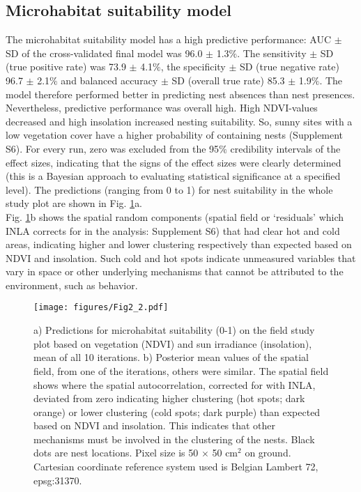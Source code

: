 \documentclass[10pt, twoside]{book} %
\begin{document}
	\subsection{Microhabitat suitability model}
	The microhabitat suitability model has a high predictive performance: AUC $\pm$ SD of the cross-validated final model was 96.0 $\pm$ 1.3$\%$. The sensitivity $\pm$ SD (true positive rate) was 73.9 $\pm$ 4.1$\%$, the specificity $\pm$ SD (true negative rate) 96.7 $\pm$ 2.1$\%$ and balanced accuracy $\pm$ SD (overall true rate) 85.3 $\pm$ 1.9$\%$. The model therefore performed better in predicting nest absences than nest presences. Nevertheless, predictive performance was overall high. High NDVI-values decreased and high insolation increased nesting suitability. So, sunny sites with a low vegetation cover have a higher probability of containing nests (Supplement S6). For every run, zero was excluded from the 95$\%$ credibility intervals of the effect sizes, indicating that the signs of the effect sizes were clearly determined (this is a Bayesian approach to evaluating statistical significance at a specified level). The predictions (ranging from 0 to 1) for nest suitability in the whole study plot are shown in Fig. \ref{fig2.2}a.\\
	
	Fig. \ref{fig2.2}b shows the spatial random components (spatial field or `residuals' which INLA corrects for in the analysis: Supplement S6) that had clear hot and cold areas, indicating higher and lower clustering respectively than expected based on NDVI and insolation. Such cold and hot spots indicate unmeasured variables that vary in space or other underlying mechanisms that cannot be attributed to the environment, such as behavior.\\
	
	\clearpage
	\hbox{}
	\vspace*{\fill}
	\begin{figure}[h!]
		\begin{center}
			\texttt{[image: figures/Fig2\_2.pdf]}
		\end{center}
		\begin{footnotesize}
			\caption{a) Predictions for microhabitat suitability (0-1) on the field study plot based on vegetation (NDVI) and sun irradiance (insolation), mean of all 10 iterations. b) Posterior mean values of the spatial field, from one of the iterations, others were similar. The spatial field shows where the spatial autocorrelation, corrected for with INLA, deviated from zero indicating higher clustering (hot spots; dark orange) or lower clustering (cold spots; dark purple) than expected based on NDVI and insolation. This indicates that other mechanisms must be involved in the clustering of the nests. Black dots are nest locations. Pixel size is 50 $\times$ 50 cm$^2$ on ground. Cartesian coordinate reference system used is Belgian Lambert 72, epsg:31370. \label{fig2.2}}
		\end{footnotesize}
	\end{figure}
	\vspace*{\fill}
	\clearpage
	
\end{document}
